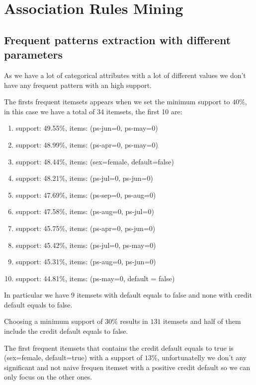 \chapter{Association Rules Mining}

\section{Frequent patterns extraction with different parameters}

As we have a lot of categorical attributes with a lot of different values we don't have any frequent pattern with an high support. 

The firsts frequent itemsets appears when we set the minimum support to $40\%$, in this case we have a total of 34 itemsets, the first 10 are:

\begin{enumerate}
  \item support: 49.55\%, items: (ps-jun=0, ps-may=0)
  \item support: 48.99\%, items: (ps-apr=0, ps-may=0)
  \item support: 48.44\%, items: (sex=female, default=false)
  \item support: 48.21\%, items: (ps-jul=0, ps-jun=0)
  \item support: 47.69\%, items: (ps-sep=0, ps-aug=0)
  \item support: 47.58\%, items: (ps-aug=0, ps-jul=0)
  \item support: 45.75\%, items: (ps-apr=0, ps-jun=0)
  \item support: 45.42\%, items: (ps-jul=0, ps-may=0)
  \item support: 45.31\%, items: (ps-aug=0, ps-jun=0)
  \item support: 44.81\%, items: (ps-may=0, default = false)
\end{enumerate}

In particular we have $9$ itemsets with default equals to false and none with credit default equals to false.

\smallskip

Choosing a minimum support of $30\%$ results in $131$ itemsets and half of them include the credit default equals to false.

\smallskip

The first frequent itemsets that contains the credit default equals to true is (sex=female, default=true) with a support of $13\%$, unfortunatelly we don't any significant and not naive frequen itemset with a positive credit default so we can only focus on the other ones.

